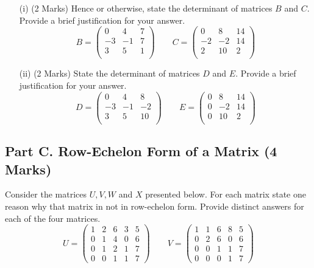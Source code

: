 \documentclass[a4paper,12pt]{article}
\begin{document}
\begin{itemize}
	\item[(i)] (2 Marks) Hence or otherwise, state the determinant of matrices $B$ and $C$. Provide a brief justification for your answer.
	\[B = \left(\begin{array}{rrr}
	0  &  4   & 7 \\
	-3  & -1  &  7\\
	3   & 5  &  1\\
	\end{array}\right) \qquad C = \left(\begin{array}{rrr}
	0  &  8   & 14 \\
	-2  & -2  &  14\\
	2   & 10  &  2\\
	\end{array}\right) \]
	
	\item[(ii)] (2 Marks) State the determinant of matrices $D$ and $E$. Provide a brief justification for your answer.
	\[D = \left(\begin{array}{rrr}
	0  &  4   & 8 \\
	-3  & -1  &  -2\\
	3   & 5  &  10\\
	\end{array}\right) \qquad E = \left(\begin{array}{rrr}
	0  &  8   & 14 \\
	0  & -2  &  14\\
	0   & 10  &  2\\
	\end{array}\right) \]
\end{itemize}






\subsection*{Part C. Row-Echelon Form of a Matrix (4 Marks)}
Consider the matrices $U,V,W$ and $X$ presented below. For each matrix state one reason why that matrix in not in row-echelon form. Provide distinct answers for each of the four matrices.
\[
U = \begin{pmatrix}
1&2 & 6  &3 & 5
\\  0&1&4 &0 & 6
\\  0&1&2 &1 & 7
\\  0&0&1 &1 & 7
\end{pmatrix} \qquad  V = \begin{pmatrix}
1&1 & 6  &8 & 5
\\  0&2&6 &0 & 6
\\  0&0&1 &1 & 7
\\  0&0&0 &1 & 7
\end{pmatrix}
\]
\end{document}
